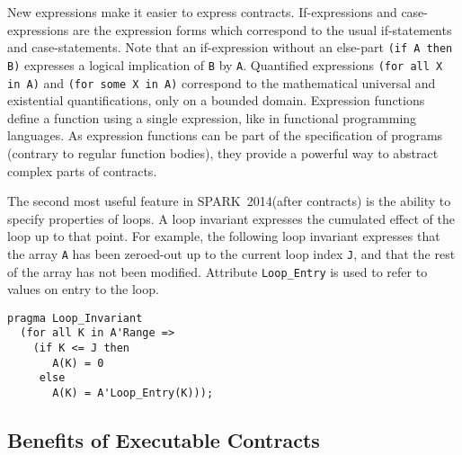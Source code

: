 \documentclass[10pt,a4paper,twocolumn]{article}
\newcommand{\newspark}{SPARK~2014\xspace}
\begin{document}

New expressions make it easier to express contracts. If-expressions
and case-expressions are the expression forms which correspond to the
usual if-statements and case-statements. Note that an if-expression
without an else-part \verb|(if A then B)| expresses a logical implication
of \verb|B| by \verb|A|. Quantified expressions
\verb|(for all X in A)| and \verb|(for some X in A)| correspond to the
mathematical universal and existential quantifications, only on a
bounded domain. Expression functions define a function using a single
expression, like in functional programming languages. As expression
functions can be part of the specification of programs (contrary to
regular function bodies), they provide a powerful way to abstract
complex parts of contracts.

The second most useful feature in \newspark (after contracts) is the
ability to specify properties of loops. A loop invariant expresses the
cumulated effect of the loop up to that point. For example, the
following loop invariant expresses that the array \verb|A| has been
zeroed-out up to the current loop index \verb|J|, and that the rest of
the array has not been modified.  Attribute \verb|Loop_Entry| is used
to refer to values on entry to the loop.

\begin{lstlisting}
pragma Loop_Invariant
  (for all K in A'Range =>
    (if K <= J then
       A(K) = 0
     else
       A(K) = A'Loop_Entry(K)));
\end{lstlisting}



\subsection{Benefits of Executable Contracts}
\label{subsec:ExecutableContracts}
\end{document}
